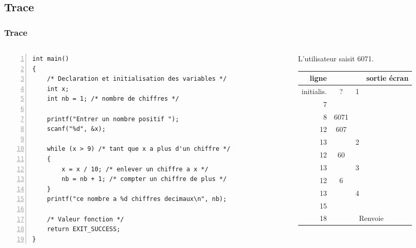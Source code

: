\documentclass[xcolor=pdftex,svgnames,table]{beamer}
\begin{document}
\subsection{Trace}
\begin{frame}[fragile]
  \frametitle{Trace}
\begin{columns}
  \begin{column}[t]{3.7cm}
 \begin{lstlisting}[numbers=left,basicstyle=\ttfamily\scriptsize]
int main()
{
    /* Declaration et initialisation des variables */
    int x;
    int nb = 1; /* nombre de chiffres */

    printf("Entrer un nombre positif ");
    scanf("%d", &x);
    
    while (x > 9) /* tant que x a plus d'un chiffre */
    {
        x = x / 10; /* enlever un chiffre a x */
        nb = nb + 1; /* compter un chiffre de plus */
    }
    printf("ce nombre a %d chiffres decimaux\n", nb);
    
    /* Valeur fonction */
    return EXIT_SUCCESS;
}
\end{lstlisting}
\vspace{.4cm}
  \end{column}
\begin{column}[t]{4cm}
\scriptsize
\pause
L'utilisateur saisit 6071.

\begin{tabular}{|r|c|c|l|}
\hline
    ligne & \C{x} & \C{nb} & sortie écran \pause \\ \hline
  initialis.& ? &  1 & \pause \\
7 &  &  & \C{Entrer\ldots}\pause \\
8 &  6071 &  & \pause\\
12 &  607 &  & \pause \\
13 &   & 2 & \pause\\
12 &  60 &  & \pause\\
13 &   & 3 & \pause \\
12 &  6 &  & \pause\\
13 &   & 4 &  \pause \\
15 & & & \C{ce nombre a 4...}\pause \\ 
18 & \multicolumn{3}{c}{Renvoie \C{EXIT\_SUCCESS}}
\end{tabular}
 \end{column}
\end{columns}
\end{frame}
\end{document}
